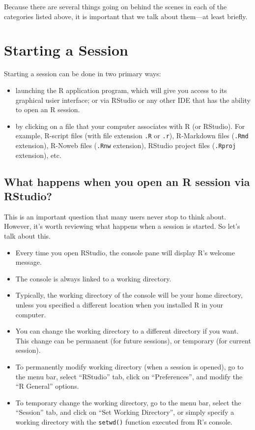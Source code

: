\documentclass[
]{book}
\begin{document}
Because there are several things going on behind the scenes in each of the
categories listed above, it is important that we talk about them---at least
briefly.

\hypertarget{starting-a-session}{%
\section{Starting a Session}\label{starting-a-session}}

Starting a session can be done in two primary ways:

\begin{itemize}
\item
  launching the R application program, which will give you access to its
  graphical usier interface; or via RStudio or any other IDE that has the
  ability to open an R session.
\item
  by clicking on a file that your computer associates with R (or RStudio).
  For example, R-script files (with file extension \texttt{.R} or \texttt{.r}), R-Markdown
  files (\texttt{.Rmd} extension), R-Noweb files (\texttt{.Rnw} extension), RStudio project
  files (\texttt{.Rproj} extension), etc.
\end{itemize}

\hypertarget{what-happens-when-you-open-an-r-session-via-rstudio}{%
\subsection{What happens when you open an R session via RStudio?}\label{what-happens-when-you-open-an-r-session-via-rstudio}}

This is an important question that many users never stop to think about.
However, it's worth reviewing what happens when a session is started. So let's
talk about this.

\begin{itemize}
\item
  Every time you open RStudio, the console pane will display R's welcome message.
\item
  The console is always linked to a working directory.
\item
  Typically, the working directory of the console will be your home directory,
  unless you specified a different location when you installed R in your computer.
\item
  You can change the working directory to a different directory if you want.
  This change can be permanent (for future sessions), or temporary (for current
  session).
\item
  To permanently modify working directory (when a session is opened), go to the
  menu bar, select ``RStudio'' tab, click on ``Preferences'', and modify the
  ``R General'' options.
\item
  To temporary change the working directory, go to the menu bar, select the
  ``Session'' tab, and click on ``Set Working Directory'', or simply specify a
  working directory with the \texttt{setwd()} function executed from R's console.
\end{itemize}
\end{document}
